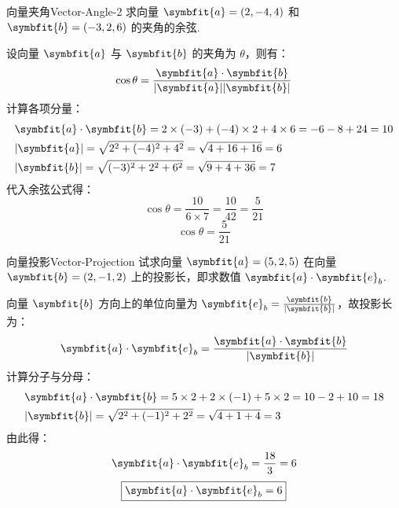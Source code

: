 \begin{problem}{向量夹角}{Vector-Angle-2}
    求向量 $\symbfit{a} = (2, -4, 4)$ 和 $\symbfit{b} = (-3, 2, 6)$ 的夹角的余弦.
\end{problem}

\begin{solution}
    设向量 $\symbfit{a}$ 与 $\symbfit{b}$ 的夹角为 $\theta$，则有：
    \begin{equation*}
        \cos \theta = \frac{\symbfit{a} \cdot \symbfit{b}}{|\symbfit{a}| |\symbfit{b}|}
    \end{equation*}
    计算各项分量：
    \begin{equation*}
        \begin{aligned}
             & \symbfit{a} \cdot \symbfit{b} = 2 \times (-3) + (-4) \times 2 + 4 \times 6 = -6 - 8 + 24 = 10 \\
             & |\symbfit{a}| = \sqrt{2^2 + (-4)^2 + 4^2} = \sqrt{4 + 16 + 16} = 6                            \\
             & |\symbfit{b}| = \sqrt{(-3)^2 + 2^2 + 6^2} = \sqrt{9 + 4 + 36} = 7
        \end{aligned}
    \end{equation*}
    代入余弦公式得：
    \begin{equation*}
        \cos \theta = \frac{10}{6 \times 7} = \frac{10}{42} = \frac{5}{21}
    \end{equation*}
    \begin{equation*}
        \boxed{\cos \theta = \frac{5}{21}}
    \end{equation*}
\end{solution}

\begin{problem}{向量投影}{Vector-Projection}
    试求向量 $\symbfit{a} = (5, 2, 5)$ 在向量 $\symbfit{b} = (2, -1, 2)$ 上的投影长，即求数值 $\symbfit{a} \cdot \symbfit{e}_b$.
\end{problem}

\begin{solution}
    向量 $\symbfit{b}$ 方向上的单位向量为 $\symbfit{e}_b = \frac{\symbfit{b}}{|\symbfit{b}|}$，故投影长为：
    \begin{equation*}
        \symbfit{a} \cdot \symbfit{e}_b = \frac{\symbfit{a} \cdot \symbfit{b}}{|\symbfit{b}|}
    \end{equation*}
    计算分子与分母：
    \begin{equation*}
        \begin{aligned}
             & \symbfit{a} \cdot \symbfit{b} = 5 \times 2 + 2 \times (-1) + 5 \times 2 = 10 - 2 + 10 = 18 \\
             & |\symbfit{b}| = \sqrt{2^2 + (-1)^2 + 2^2} = \sqrt{4 + 1 + 4} = 3
        \end{aligned}
    \end{equation*}
    由此得：
    \begin{equation*}
        \symbfit{a} \cdot \symbfit{e}_b = \frac{18}{3} = 6
    \end{equation*}
    \begin{equation*}
        \boxed{\symbfit{a} \cdot \symbfit{e}_b = 6}
    \end{equation*}
\end{solution}


